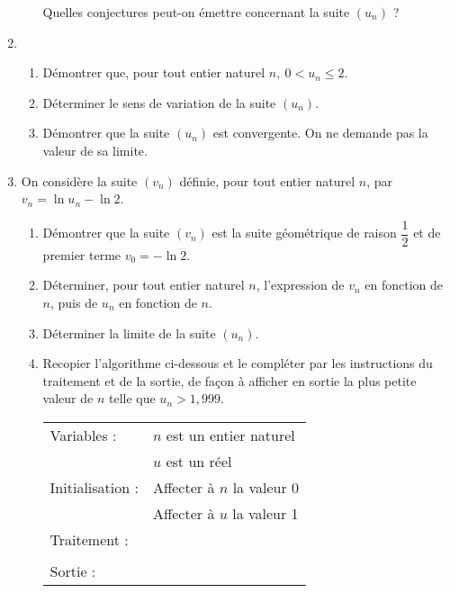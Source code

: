 \begin{enumerate}
\begin{enumerate}
Quelles conjectures peut-on émettre concernant la suite $\left(u_{n}\right)$ ?
	\end{enumerate} 
\item
	\begin{enumerate}
		\item Démontrer que, pour tout entier naturel $n,\: 0 < u_{n} \leqslant 2$. 
		\item Déterminer le sens de variation de la suite $\left(u_{n}\right)$. 
		\item Démontrer que la suite $\left(u_{n}\right)$ est convergente. On ne demande pas la valeur de sa limite.
	\end{enumerate} 
\item On considère la suite $\left(v_{n}\right)$ définie, pour tout entier naturel $n$, par $v_{n} = \ln u_{n} - \ln 2$. 
	\begin{enumerate}
		\item Démontrer que la suite $\left(v_{n}\right)$ est la suite géométrique de raison $\dfrac{1}{2}$ et de premier terme  
$v_{0} = - \ln 2$. 
		\item Déterminer, pour tout entier naturel $n$, l'expression de $v_{n}$ en fonction de $n$, puis de $u_{n}$ en fonction de $n$. 
		\item Déterminer la limite de la suite $\left(u_{n}\right)$. 
		\item Recopier l'algorithme ci-dessous et le compléter par les instructions du traitement et de la sortie, de façon à afficher en sortie la plus petite valeur de $n$ telle que $u_{n} > 1,999$.
		
\begin{center}
\begin{tabular}{|l l|}\hline		 
Variables :		&$n$ est un entier naturel\\
				& $u$ est un réel\\
Initialisation :&Affecter à $n$ la valeur $0$\\
				&Affecter à $u$ la valeur 1\\ 
Traitement :	&\\
				&\\ 
Sortie :		&\\ \hline
\end{tabular}
\end{center}
	\end{enumerate} 
\end{enumerate}